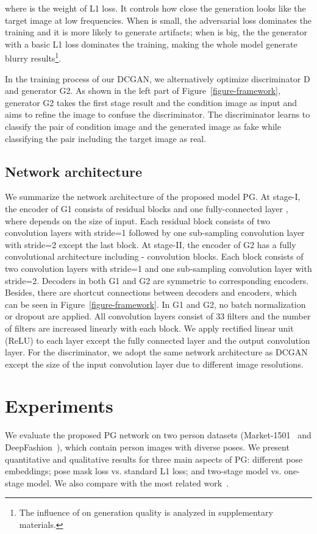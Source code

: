 \documentclass{article}
\begin{document}
where  is the weight of L1 loss. It controls how close the generation looks like the target image at low frequencies. When  is small, the adversarial loss dominates the training and it is more likely to generate artifacts; when  is big, the the generator with a basic L1 loss  dominates the training, making the whole model generate blurry results\footnote{The influence of  on generation quality is analyzed in supplementary materials.}.

In the training process of our DCGAN, we alternatively optimize discriminator D and generator G2. As shown in the left part of Figure~\ref{figure-framework}, generator G2 takes the first stage result and the condition image as input and aims to refine the image to confuse the discriminator. The discriminator learns to classify the pair of condition image and the generated image as fake while classifying the pair including the target image as real.



 
\subsection{Network architecture}
We summarize the network architecture of the proposed model PG. At stage-I, the encoder of G1 consists of  residual blocks and one fully-connected layer
, where  depends on the size of input. Each residual block consists of two convolution layers with stride=1 followed by one sub-sampling convolution layer with stride=2 except the last block.
At stage-II, the encoder of G2 has a fully convolutional architecture including - convolution blocks. Each block consists of two convolution layers with stride=1 and one sub-sampling convolution layer with stride=2. Decoders in both G1 and G2 are symmetric to corresponding encoders. Besides, there are shortcut connections between decoders and encoders, which can be seen in Figure~\ref{figure-framework}. In G1 and G2, no batch normalization or dropout are applied. All convolution layers consist of 33 filters and the number of filters are increased linearly with each block. We apply rectified linear unit (ReLU) to each layer except the fully connected layer and the output convolution layer. For the discriminator, we adopt the same network architecture as DCGAN~\cite{Radford2015-DCGAN} except the size of the input convolution layer due to different image resolutions.




 \section{Experiments}
\label{experiments}
We evaluate the proposed PG network on two person datasets (Market-1501~\cite{Market1501} and DeepFashion~\cite{DeepFashion}), which contain person images 
with diverse poses. 
We present quantitative and qualitative results for three main aspects of   
 PG: different pose embeddings; pose mask loss vs. standard L1 loss; and two-stage model vs. one-stage model. 
We also compare with the most related work~\cite{Zhao-Arxiv16-Multiview}.
\end{document}
